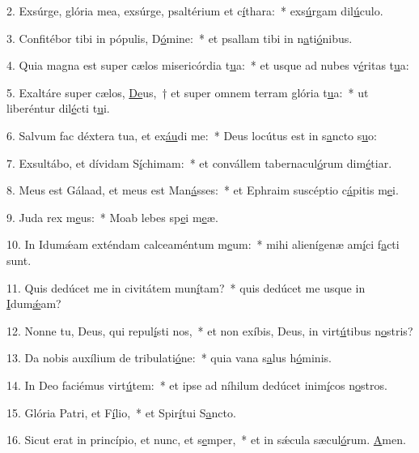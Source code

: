 2. Exsúrge, glória mea, exsúrge, psaltérium et c\uline{í}thara:~* exs\uline{ú}rgam dil\uline{ú}culo.\par 
3. Confitébor tibi in pópulis, D\uline{ó}mine:~* et psallam tibi in n\uline{a}ti\uline{ó}nibus.\par 
4. Quia magna est super cælos misericórdia t\uline{u}a:~* et usque ad nubes v\uline{é}ritas t\uline{u}a:\par 
5. Exaltáre super cælos, \uline{De}us,~† et super omnem terram glória t\uline{u}a:~* ut liberéntur dil\uline{é}cti t\uline{u}i.\par 
6. Salvum fac déxtera tua, et ex\uline{áu}di me:~* Deus locútus est in s\uline{a}ncto s\uline{u}o:\par 
7. Exsultábo, et dívidam S\uline{í}chimam:~* et convállem tabernacul\uline{ó}rum dim\uline{é}tiar.\par 
8. Meus est Gálaad, et meus est Man\uline{á}sses:~* et Ephraim suscéptio c\uline{á}pitis m\uline{e}i.\par 
9. Juda rex m\uline{e}us:~* Moab lebes sp\uline{e}i m\uline{e}æ.\par 
10. In Idumǽam exténdam calceaméntum m\uline{e}um:~* mihi alienígenæ am\uline{í}ci f\uline{a}cti sunt.\par 
11. Quis dedúcet me in civitátem mun\uline{í}tam?~* quis dedúcet me usque in \uline{I}dum\uline{ǽ}am?\par 
12. Nonne tu, Deus, qui repul\uline{í}sti nos,~* et non exíbis, Deus, in virt\uline{ú}tibus n\uline{o}stris?\par 
13. Da nobis auxílium de tribulati\uline{ó}ne:~* quia vana s\uline{a}lus h\uline{ó}minis.\par 
14. In Deo faciémus virt\uline{ú}tem:~* et ipse ad níhilum dedúcet inim\uline{í}cos n\uline{o}stros.\par 
15. Glória Patri, et F\uline{í}lio,~* et Spir\uline{í}tui S\uline{a}ncto.\par 
16. Sicut erat in princípio, et nunc, et s\uline{e}mper,~* et in sǽcula sæcul\uline{ó}rum. \uline{A}men.\par 
